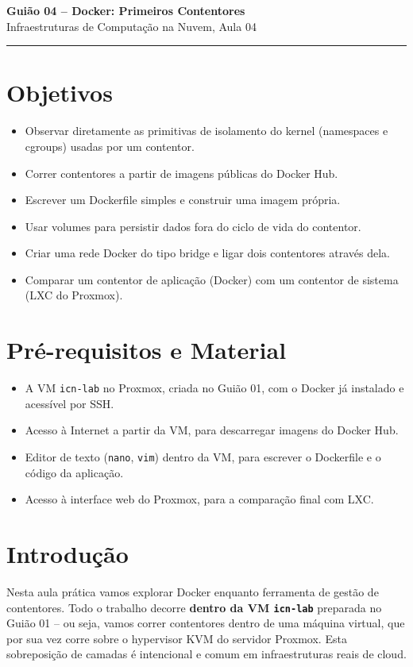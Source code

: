 \documentclass[11pt,a4paper]{article}
\newcommand{\guiaotitle}[2]{%
  \begin{center}
  {\Large\bfseries\color{TextEspresso} #1}\\[0.3cm]
  {\normalsize\color{NudeTaupe} #2}\\[0.2cm]
  {\color{NudeTaupe}\rule{4cm}{0.5pt}}
  \end{center}
  \vspace{0.5cm}
}
\begin{document}
\guiaotitle{Guião 04 -- Docker: Primeiros Contentores}{Infraestruturas de Computação na Nuvem, Aula 04}

\section{Objetivos}
\begin{itemize}
  \item Observar diretamente as primitivas de isolamento do kernel (namespaces e cgroups) usadas por um contentor.
  \item Correr contentores a partir de imagens públicas do Docker Hub.
  \item Escrever um Dockerfile simples e construir uma imagem própria.
  \item Usar volumes para persistir dados fora do ciclo de vida do contentor.
  \item Criar uma rede Docker do tipo bridge e ligar dois contentores através dela.
  \item Comparar um contentor de aplicação (Docker) com um contentor de sistema (LXC do Proxmox).
\end{itemize}

\section{Pré-requisitos e Material}
\begin{itemize}
  \item A VM \texttt{icn-lab} no Proxmox, criada no Guião 01, com o Docker já instalado e acessível por SSH.
  \item Acesso à Internet a partir da VM, para descarregar imagens do Docker Hub.
  \item Editor de texto (\texttt{nano}, \texttt{vim}) dentro da VM, para escrever o Dockerfile e o código da aplicação.
  \item Acesso à interface web do Proxmox, para a comparação final com LXC.
\end{itemize}

\section{Introdução}
Nesta aula prática vamos explorar Docker enquanto ferramenta de gestão de contentores. Todo o trabalho decorre \textbf{dentro da VM \texttt{icn-lab}} preparada no Guião 01 -- ou seja, vamos correr contentores dentro de uma máquina virtual, que por sua vez corre sobre o hypervisor KVM do servidor Proxmox. Esta sobreposição de camadas é intencional e comum em infraestruturas reais de cloud.
\end{document}
